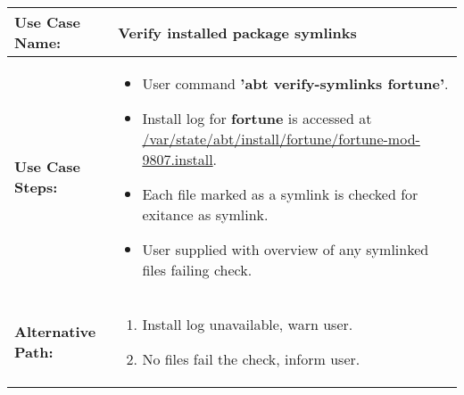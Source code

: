 \medskip

\begin{tabularx}{\linewidth}{|l|X|}
\hline
\textbf{Use Case Name:} & \textbf{Verify installed package symlinks} \\
\hline
\textbf{Use Case Steps:} & 
\begin{minipage}{\linewidth} 
  \vspace{0.05em}
  \begin{itemize}
    \item User command \textbf{'abt verify-symlinks fortune'}.
    \item Install log for \textbf{fortune} is accessed at \url{/var/state/abt/install/fortune/fortune-mod-9807.install}.
    \item Each file marked as a symlink is checked for exitance as symlink.
    \item User supplied with overview of any symlinked files failing check.
  \end{itemize}
  \vspace{0.05em}
\end{minipage}
\\
\hline 
\textbf{Alternative Path:} &
\begin{minipage}{\linewidth}
  \vspace{0.05em} 
  \begin{enumerate}
    \item Install log unavailable, warn user.
    \item No files fail the check, inform user.
  \end{enumerate}
  \vspace{0.05em} 
\end{minipage}
\\
\hline
\end{tabularx}